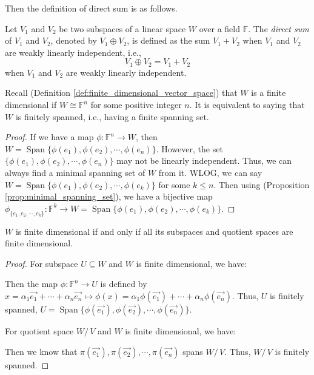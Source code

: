 \documentclass[
	11pt, %
	fleqn, %
	a4paper, %
]{LegrandOrangeBook}
\newcommand{\quotient}[2]{#1 /\, #2} %
\newcommand{\F}{\mathbb{F}} %
\DeclareMathOperator{\Span}{Span}
\begin{document}
Then the definition of direct sum is as follows.
\begin{definition}
    Let $V_1$ and $V_2$ be two subspaces of a linear space $W$ over a field $\F$. The \emph{direct sum} of $V_1$ and $V_2$, denoted by $V_1 \oplus V_2$, is defined as the sum $V_1 + V_2$ when $V_1$ and $V_2$ are weakly linearly independent, i.e.,
    \[
        V_1 \oplus V_2 = V_1 + V_2
    \]
    when $V_1$ and $V_2$ are weakly linearly independent.    
\end{definition}

Recall (Definition \ref{def:finite_dimensional_vector_space}) that $W$ is a finite dimensional if $W \cong \F^n$ for some positive integer $n$. It is equivalent to saying that $W$ is finitely spanned, i.e., having a finite spanning set.

\begin{proof}
    If we have a map $\phi : \F^n \to W$, then $W = \Span\{\phi(e_1), \phi(e_2), \cdots, \phi(e_n)\}$. However, the set $\{\phi(e_1), \phi(e_2), \cdots, \phi(e_n)\}$ may not be linearly independent. Thus, we can always find a minimal spanning set of $W$ from it. WLOG, we can say $W = \Span\{\phi(e_1), \phi(e_2), \cdots, \phi(e_k)\}$ for some $k \leq n$. Then using (Proposition \ref{prop:minimal_spanning_set}), we have a bijective map $\phi_{\{e_1, e_2, \cdots, e_k\}} : \F^k \to W = \Span\{\phi(e_1), \phi(e_2), \cdots, \phi(e_k)\}$.
\end{proof}

\begin{proposition} \label{prop:finite_dimensional_subspace_quotient_space}
    $W$ is finite dimensional if and only if all its subspaces and quotient spaces are finite dimensional.
\end{proposition}

\begin{proof}
    For subspace $U \subseteq W$ and $W$ is finite dimensional, we have:
    \begin{center}
    \end{center}
    Then the map $\phi : \F^n \to U$ is defined by $x = \alpha_1 \vec{e_1} + \cdots + \alpha_n \vec{e_n} \mapsto \phi(x) = \alpha_1 \phi(\vec{e_1}) + \cdots + \alpha_n \phi(\vec{e_n})$. Thus, $U$ is finitely spanned, $U = \Span\{\phi(\vec{e_1}), \phi(\vec{e_2}), \cdots, \phi(\vec{e_n})\}$. 

    For quotient space $\quotient{W}{V}$ and $W$ is finite dimensional, we have:
    \begin{center}
    \end{center}
    Then we know that $\pi(\vec{e_1}), \pi(\vec{e_2}), \cdots, \pi(\vec{e_n})$ spans $\quotient{W}{V}$. Thus, $\quotient{W}{V}$ is finitely spanned.
\end{proof}
\end{document}
